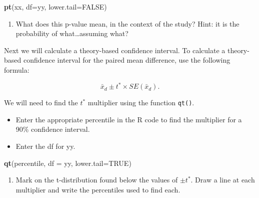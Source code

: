 \documentclass[
]{report}
\newenvironment{Shaded}{\begin{snugshade}}{\end{snugshade}}
\newcommand{\AttributeTok}[1]{\textcolor[rgb]{0.13,0.29,0.53}{#1}}
\newcommand{\ConstantTok}[1]{\textcolor[rgb]{0.56,0.35,0.01}{#1}}
\newcommand{\FunctionTok}[1]{\textcolor[rgb]{0.13,0.29,0.53}{\textbf{#1}}}
\newcommand{\NormalTok}[1]{#1}
\providecommand{\tightlist}{%
  \setlength{\itemsep}{0pt}\setlength{\parskip}{0pt}}
\begin{document}
\begin{Shaded}
\begin{Highlighting}[]
\FunctionTok{pt}\NormalTok{(xx, }\AttributeTok{df=}\NormalTok{yy, }\AttributeTok{lower.tail=}\ConstantTok{FALSE}\NormalTok{)}
\end{Highlighting}
\end{Shaded}

\begin{enumerate}
\def\labelenumi{\arabic{enumi}.}
\setcounter{enumi}{8}
\tightlist
\item
  What does this p-value mean, in the context of the study? Hint: it is the probability of what\ldots assuming what?
  \vspace{1in}
\end{enumerate}

Next we will calculate a theory-based confidence interval. To calculate a theory-based confidence interval for the paired mean difference, use the following formula:

\[\bar{x}_d\pm t^* \times SE(\bar{x}_d).\]

We will need to find the \(t^*\) multiplier using the function \texttt{qt()}.

\begin{itemize}
\item
  Enter the appropriate percentile in the R code to find the multiplier for a 90\% confidence interval.
\item
  Enter the df for yy.
\end{itemize}

\begin{Shaded}
\begin{Highlighting}[]
\FunctionTok{qt}\NormalTok{(percentile, }\AttributeTok{df =}\NormalTok{ yy, }\AttributeTok{lower.tail=}\ConstantTok{TRUE}\NormalTok{)}
\end{Highlighting}
\end{Shaded}

\newpage

\begin{enumerate}
\def\labelenumi{\arabic{enumi}.}
\setcounter{enumi}{10}
\tightlist
\item
  Mark on the t-distribution found below the values of \(\pm t^*\). Draw a line at each multiplier and write the percentiles used to find each.
  \vspace{1mm}
\end{enumerate}
\end{document}
